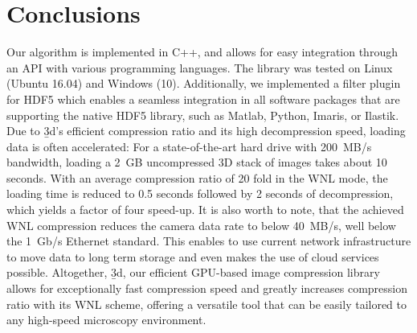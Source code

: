 \section{Conclusions}
Our algorithm is implemented in C++, and allows for easy integration through an API with various programming languages. The library was tested on Linux (Ubuntu 16.04) and Windows (10). Additionally, we implemented a filter plugin for HDF5 which enables a seamless integration in all software packages that are supporting the native HDF5 library, such as Matlab, Python, Imaris, or Ilastik. Due to \b3d’s efficient compression ratio and its high decompression speed, loading data is often accelerated: For a state-of-the-art hard drive with \SI{200}{MB/s} bandwidth, loading a \SI{2}{GB} uncompressed 3D stack of images takes about 10 seconds. With an average compression ratio of 20 fold in the WNL mode, the loading time is reduced to 0.5 seconds followed by 2 seconds of decompression, which yields a factor of four speed-up. It is also worth to note, that the achieved WNL compression reduces the camera data rate to below \SI{40}{MB/s}, well below the \SI{1}{Gb/s} Ethernet standard. This enables to use current network infrastructure to move data to long term storage and even makes the use of cloud services possible. Altogether, \b3d, our efficient GPU-based image compression library allows for exceptionally fast compression speed and greatly increases compression ratio with its WNL scheme, offering a versatile tool that can be easily tailored to any high-speed microscopy environment.